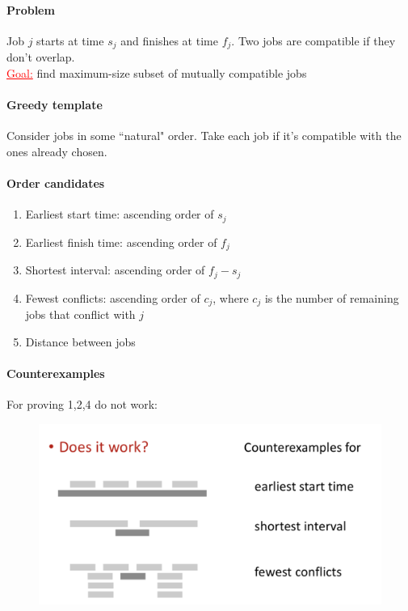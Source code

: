 \documentclass[11pt]{article}
\newcommand{\under}[1]{\underline{#1}}
\begin{document}
\paragraph{Problem}
Job $j$ starts at time $s_j$ and finishes at time $f_j$. Two jobs are compatible if they don't overlap. \\
\textcolor{red}{\under{Goal:}} find maximum-size subset of mutually compatible jobs

\paragraph{Greedy template}
Consider jobs in some ``natural" order. Take each job if it's compatible with the ones already chosen.

\paragraph{Order candidates}
\begin{enumerate}
	\item Earliest start time: ascending order of $s_j$
	\item Earliest finish time: ascending order of $f_j$
	\item Shortest interval: ascending order of $f_j - s_j$
	\item Fewest conflicts: ascending order of $c_j$, where $c_j$ is the number of remaining jobs that conflict with $j$
	\item Distance between jobs
\end{enumerate}

\paragraph{Counterexamples}
For proving 1,2,4 do not work:
\begin{figure}[h]
	\centering
	\includegraphics[scale=0.5]{p8}
\end{figure}
\end{document}
